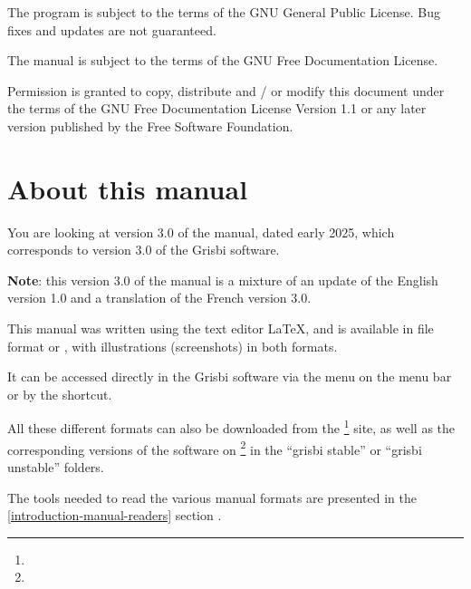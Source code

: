 The program is subject to the terms of the \gls{GNU General Public License}.  Bug fixes and updates are not guaranteed.

The manual is subject to the terms of the \gls{GNU Free Documentation License}.

Permission is granted to copy, distribute and / or modify this document under the terms of the GNU Free Documentation License Version 1.1 or any later version published by the Free Software Foundation.

\section{About this manual \label{introduction-manual}}

You are looking at version \actuality{}3.0 of the manual, dated \actuality{} early 2025, which corresponds to version 3.0 of the Grisbi software.


\textbf{Note}: this version 3.0 of the manual is a mixture of an update of the English version 1.0 and a translation of the French version 3.0.


This manual was written using the \gls{text editor} \gls{LaTeX}, and is available in \gls{file format}  or , with illustrations (screenshots) in both formats.


It can be accessed directly in the Grisbi software via the  menu on the menu bar or by the  shortcut.


All these different formats can also be downloaded from the \footnote{\urlSourceForgeDocumentation{}} site, as well as the corresponding versions of the software on \footnote{\urlSourceForge{}} in the ``\textsf{grisbi stable}'' or ``\textsf{grisbi unstable}'' folders.


The tools needed to read the various manual formats are presented in the  \vref{introduction-manual-readers} section .


